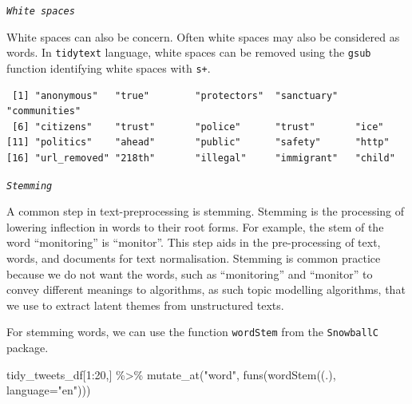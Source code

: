 \documentclass[
  letterpaper,
  DIV=11,
  numbers=noendperiod]{scrreprt}
\newenvironment{Shaded}{\begin{snugshade}}{\end{snugshade}}
\newcommand{\AttributeTok}[1]{\textcolor[rgb]{0.40,0.45,0.13}{#1}}
\newcommand{\DecValTok}[1]{\textcolor[rgb]{0.68,0.00,0.00}{#1}}
\newcommand{\FunctionTok}[1]{\textcolor[rgb]{0.28,0.35,0.67}{#1}}
\newcommand{\NormalTok}[1]{\textcolor[rgb]{0.00,0.23,0.31}{#1}}
\newcommand{\SpecialCharTok}[1]{\textcolor[rgb]{0.37,0.37,0.37}{#1}}
\newcommand{\StringTok}[1]{\textcolor[rgb]{0.13,0.47,0.30}{#1}}
\begin{document}
\emph{\texttt{White\ spaces}}

White spaces can also be concern. Often white spaces may also be
considered as words. In \texttt{tidytext} language, white spaces can be
removed using the \texttt{gsub} function identifying white spaces with
\texttt{s+}.

\begin{Shaded}
\end{Shaded}

\begin{verbatim}
 [1] "anonymous"   "true"        "protectors"  "sanctuary"   "communities"
 [6] "citizens"    "trust"       "police"      "trust"       "ice"        
[11] "politics"    "ahead"       "public"      "safety"      "http"       
[16] "url_removed" "218th"       "illegal"     "immigrant"   "child"      
\end{verbatim}

\emph{\texttt{Stemming}}

A common step in text-preprocessing is stemming. Stemming is the
processing of lowering inflection in words to their root forms. For
example, the stem of the word ``monitoring'' is ``monitor''. This step
aids in the pre-processing of text, words, and documents for text
normalisation. Stemming is common practice because we do not want the
words, such as ``monitoring'' and ``monitor'' to convey different
meanings to algorithms, as such topic modelling algorithms, that we use
to extract latent themes from unstructured texts.

For stemming words, we can use the function \texttt{wordStem} from the
\texttt{SnowballC} package.

\begin{Shaded}
\begin{Highlighting}[]
\NormalTok{tidy\_tweets\_df[}\DecValTok{1}\SpecialCharTok{:}\DecValTok{20}\NormalTok{,] }\SpecialCharTok{\%\textgreater{}\%}
      \FunctionTok{mutate\_at}\NormalTok{(}\StringTok{"word"}\NormalTok{, }
                \FunctionTok{funs}\NormalTok{(}\FunctionTok{wordStem}\NormalTok{((.), }
                              \AttributeTok{language=}\StringTok{"en"}\NormalTok{)))}
\end{Highlighting}
\end{Shaded}
\end{document}

